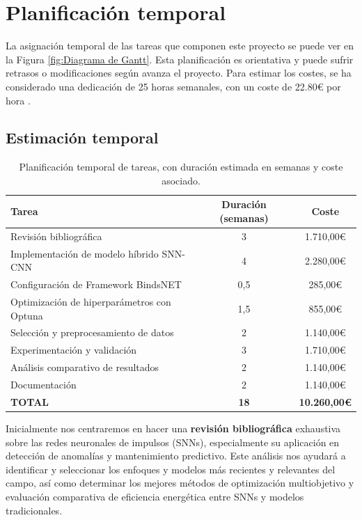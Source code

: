\section{Planificación temporal}

La asignación temporal de las tareas que componen este proyecto se puede ver en la Figura \ref{fig:Diagrama de Gantt}. Esta planificación es orientativa y puede sufrir retrasos o modificaciones según avanza el proyecto. Para estimar los costes, se ha considerado una dedicación de 25 horas semanales, con un coste de 22.80€ por hora \cite{Talent.com_2024}.

\subsection{Estimación temporal}

\begin{table}[htbp]
\centering
\begin{tabular}{lcc}
\hline \hline
\textbf{Tarea} & \textbf{Duración (semanas)} & \textbf{Coste} \\
\hline
Revisión bibliográfica & 3 & 1.710,00€ \\
Implementación de modelo híbrido SNN-CNN & 4 & 2.280,00€ \\
Configuración de Framework BindsNET & 0,5 & 285,00€ \\
Optimización de hiperparámetros con Optuna & 1,5 & 855,00€ \\
Selección y preprocesamiento de datos & 2 & 1.140,00€ \\
Experimentación y validación & 3 & 1.710,00€ \\
Análisis comparativo de resultados & 2 & 1.140,00€ \\
Documentación  & 2 & 1.140,00€ \\
\hline
\textbf{TOTAL} & \textbf{18} & \textbf{10.260,00€} \\
\hline \hline
\end{tabular}
\caption{Planificación temporal de tareas, con duración estimada en semanas y coste asociado.}
\label{tab:planificacion_tareas}
\end{table}

Inicialmente nos centraremos en hacer una \textbf{revisión bibliográfica} exhaustiva sobre las redes neuronales de impulsos (SNNs), especialmente su aplicación en detección de anomalías y mantenimiento predictivo. Este análisis nos ayudará a identificar y seleccionar los enfoques y modelos más recientes y relevantes del campo, así como determinar los mejores métodos de optimización multiobjetivo y evaluación comparativa de eficiencia energética entre SNNs y modelos tradicionales.

